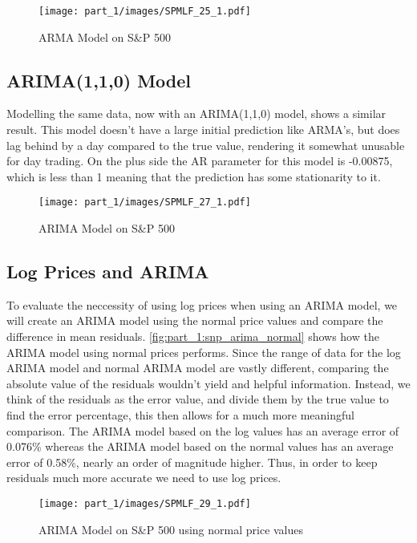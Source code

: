 \begin{figure}[!htb]
    \centering
    \texttt{[image: part\_1/images/SPMLF\_25\_1.pdf]}
    \caption{ARMA Model on S\&P 500}
    \label{fig:part_1:snp_arma}
\end{figure}

\subsection{ARIMA(1,1,0) Model}
Modelling the same data, now with an ARIMA(1,1,0) model, shows a similar result. This model doesn't have a large initial prediction like ARMA's, but does lag behind by a day compared to the true value, rendering it somewhat unusable for day trading. On the plus side the AR parameter for this model is -0.00875, which is less than 1 meaning that the prediction has some stationarity to it.

\begin{figure}[!htb]
    \centering
    \texttt{[image: part\_1/images/SPMLF\_27\_1.pdf]}
    \caption{ARIMA Model on S\&P 500}
    \label{fig:part_1:snp_arima}
\end{figure}

\subsection{Log Prices and ARIMA}

To evaluate the neccessity of using log prices when using an ARIMA model, we will create an ARIMA model using the normal price values and compare the difference in mean residuals. \autoref{fig:part_1:snp_arima_normal} shows how the ARIMA model using normal prices performs. Since the range of data for the log ARIMA model and normal ARIMA model are vastly different, comparing the absolute value of the residuals wouldn't yield and helpful information. Instead, we think of the residuals as the error value, and divide them by the true value to find the error percentage, this then allows for a much more meaningful comparison. The ARIMA model based on the log values has an average error of 0.076\% whereas the ARIMA model based on the normal values has an average error of 0.58\%, nearly an order of magnitude higher. Thus, in order to keep residuals much more accurate we need to use log prices.

\begin{figure}[!htb]
    \centering
    \texttt{[image: part\_1/images/SPMLF\_29\_1.pdf]}
    \caption{ARIMA Model on S\&P 500 using normal price values}
    \label{fig:part_1:snp_arima_normal}
\end{figure}

